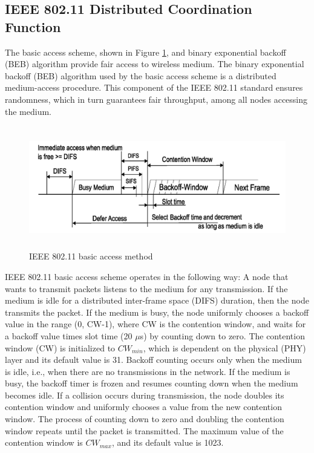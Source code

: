 \documentclass[12pt,letterpaper,english]{article}
\begin{document}
\subsection{IEEE 802.11 Distributed Coordination Function}
\indent The basic access scheme, shown in Figure \ref{figure:basicaccess}, and binary exponential backoff (BEB) algorithm provide fair access to wireless medium. The binary exponential backoff (BEB) algorithm used by the basic access scheme is a distributed medium-access procedure. This component of the IEEE 802.11 standard ensures randomness, which in turn guarantees fair throughput, among all nodes accessing the medium.
\begin{figure}[H]
\centering
\includegraphics[width=4.5in,height=2.1in]{figures/backoff.png}
\caption{IEEE 802.11 basic access method}
\label{figure:basicaccess}
\end{figure}
IEEE 802.11 basic access scheme operates in the following way: A node that wants to transmit packets listens to the medium for any transmission. If the medium is idle for a distributed inter-frame space (DIFS) duration, then the node transmits the packet. 
If the medium is busy, the node uniformly chooses a backoff value in the range (0, CW-1), where CW is the contention window, and waits for a backoff value 
times slot time (20 $\mu$s) by counting down to zero. The contention window (CW) is initialized to $CW_{min}$, which is dependent on the physical (PHY) layer and its default value is 31. 
Backoff counting occurs only when the medium is idle, i.e., when there are no transmissions in the network. If the medium is busy, the backoff timer is frozen and resumes counting down when the medium becomes idle. 
If a collision occurs during transmission, the node doubles its contention window and uniformly chooses a value from the new contention window. 
The process of counting down to zero and doubling the contention window repeats until the packet is transmitted. The maximum value of the contention window is $CW_{max}$, and its default value is 1023.
\end{document}
